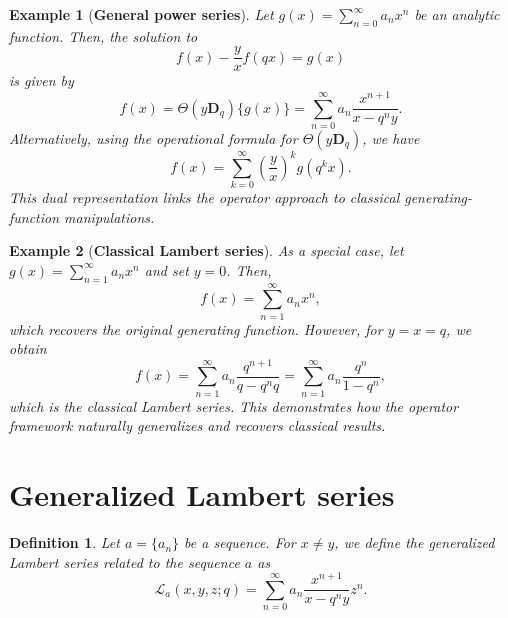 \documentclass[12pt]{article}
\newcommand{\D}{\mathbf{D}}
\newcommand{\thp}{\Theta}
\newtheorem{definition}{Definition}
\newtheorem{example}{Example}
\begin{document}
\begin{example}[\bf General power series]
Let $g(x)=\sum_{n=0}^{\infty}a_nx^n$ be an analytic function. Then, the solution to
\begin{equation}
    f(x)-\frac{y}{x}f(qx)=g(x)
\end{equation}
is given by
\begin{equation}
    f(x)=\thp(y\D_q)\{g(x)\}=\sum_{n=0}^{\infty}a_n\frac{x^{n+1}}{x-q^ny}.
\end{equation}
Alternatively, using the operational formula for $\thp(y\D_q)$, we have
\begin{equation}
    f(x)=\sum_{k=0}^{\infty}\left(\frac{y}{x}\right)^kg(q^kx).
\end{equation}
This dual representation links the operator approach to classical generating-function manipulations.
\end{example}

\begin{example}[\bf Classical Lambert series]
As a special case, let $g(x)=\sum_{n=1}^{\infty}a_nx^n$ and set $y=0$. Then,
\begin{equation}
    f(x)=\sum_{n=1}^{\infty}a_nx^n,
\end{equation}
which recovers the original generating function. However, for $y=x=q$, we obtain
\begin{equation}
    f(x)=\sum_{n=1}^{\infty}a_n\frac{q^{n+1}}{q-q^nq}=\sum_{n=1}^{\infty}a_n\frac{q^{n}}{1-q^n},
\end{equation}
which is the classical Lambert series. This demonstrates how the operator framework naturally generalizes and recovers classical results.
\end{example}




\section{Generalized Lambert series}


\begin{definition}
Let $a=\{a_n\}$ be a sequence. For $x\neq y$, we define the generalized Lambert series related to the sequence $a$ as
    \begin{equation}
        \mathcal{L}_a(x,y,z;q)=\sum_{n=0}^{\infty}a_{n}\frac{x^{n+1}}{x-q^ny}z^n    .
    \end{equation}
\end{definition}
\end{document}
